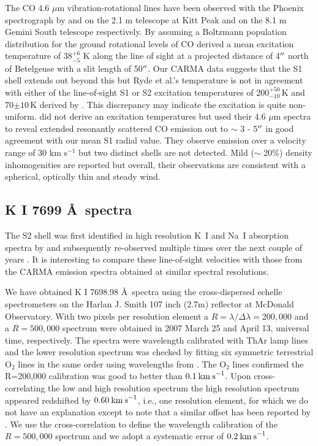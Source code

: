 \documentclass[iop]{emulateapj}
\begin{document}
The CO 4.6 $\mu$m vibration-rotational lines have been observed with the Phoenix spectrograph \citep{1998SPIE.3354..810H} by \cite{1999A&A...347L..35R} and \cite{2009AJ....137.3558S} on the 2.1 m telescope at Kitt Peak and on the 8.1 m Gemini South telescope respectively. By assuming a Boltzmann population distribution for the ground rotational levels of CO \cite{1999A&A...347L..35R}  derived a mean excitation temperature of 38${}^{+6}_{-5}$ K along the line of sight at a projected distance of 4$\mbox{$^{\prime\prime}$}$ north of Betelgeuse with a slit length of 50$\mbox{$^{\prime\prime}$}$. Our CARMA data suggests that the S1 shell extends out beyond this but Ryde et al.'s temperature is not in agreement with either of the line-of-sight S1 or S2 excitation temperatures of 200${}^{+50}_{-10}$\,K and 70$\pm 10$\,K derived by \cite{1979ApJ...233L.135B}. This discrepancy may indicate the excitation is quite non-uniform.
\cite{2009AJ....137.3558S} did not derive an excitation temperatures but used their 4.6 $\mu$m spectra to reveal extended resonantly scattered CO emission out to $\sim$ 3 - 5$\mbox{$^{\prime\prime}$}$ in good agreement with our mean S1 radial value. They observe emission over a velocity range of 30 km s${}^{-1}$ but two distinct shells are not detected. Mild ($\sim$ 20\%) density inhomogenities are reported but overall, their observations are consistent with a spherical, optically thin and steady wind.

\subsection{K I 7699 \AA \ spectra}

The S2 shell was first identified in high resolution K~I and Na~I absorption spectra by \cite{1975ApJ...199..427G} and subsequently re-observed multiple times over the next couple of years \citep{1979QJRAS..20..361G}. It is interesting to compare these line-of-sight velocities with those from the CARMA emission spectra obtained at similar spectral resolutions.

We have obtained K I 7698.98 \AA \ spectra using the cross-dispersed echelle spectrometers on the Harlan J. Smith 107 inch (2.7m) reflector at McDonald Observatory. With two pixels per resolution element a $R=\lambda/\Delta\lambda=200,000$ and a $R=500,000$ spectrum were obtained in 2007 March 25 and April 13, universal time, respectively. The spectra were wavelength calibrated with ThAr lamp lines and the lower resolution spectrum was checked by fitting six symmetric terrestrial O${}_2$ lines in the same order using wavelengths from \cite{1948ApJ...108..167B}. The O${}_2$ lines confirmed the R=200,000 calibration was good to better than $0.1\>{\rm km\>s}^{-1}$. Upon cross-correlating the low and high resolution spectrum the high resolution spectrum appeared redshifted by $0.60\>{\rm km\>s}^{-1}$, i.e., one resolution element, for which we do not have an explanation except to note that a similar offset has been reported by \cite{1994ApJ...436..152W}. We use the cross-correlation to define the wavelength calibration of the $R=500,000$ spectrum and we adopt a systematic error of $0.2\>{\rm km\>s}^{-1}$.
\end{document}
